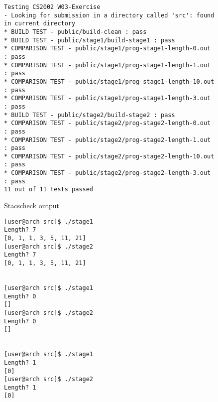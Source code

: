 \documentclass{article}
\begin{document}
\begin{figure}[H]
\begin{verbatim}
Testing CS2002 W03-Exercise
- Looking for submission in a directory called 'src': found in current directory
* BUILD TEST - public/build-clean : pass
* BUILD TEST - public/stage1/build-stage1 : pass
* COMPARISON TEST - public/stage1/prog-stage1-length-0.out : pass
* COMPARISON TEST - public/stage1/prog-stage1-length-1.out : pass
* COMPARISON TEST - public/stage1/prog-stage1-length-10.out : pass
* COMPARISON TEST - public/stage1/prog-stage1-length-3.out : pass
* BUILD TEST - public/stage2/build-stage2 : pass
* COMPARISON TEST - public/stage2/prog-stage2-length-0.out : pass
* COMPARISON TEST - public/stage2/prog-stage2-length-1.out : pass
* COMPARISON TEST - public/stage2/prog-stage2-length-10.out : pass
* COMPARISON TEST - public/stage2/prog-stage2-length-3.out : pass
11 out of 11 tests passed
\end{verbatim}
\caption{Stacscheck output}
\end{figure}

\begin{figure}[H]
\begin{verbatim}
[user@arch src]$ ./stage1
Length? 7
[0, 1, 1, 3, 5, 11, 21]
[user@arch src]$ ./stage2
Length? 7
[0, 1, 1, 3, 5, 11, 21]


[user@arch src]$ ./stage1
Length? 0
[]
[user@arch src]$ ./stage2
Length? 0
[]


[user@arch src]$ ./stage1
Length? 1
[0]
[user@arch src]$ ./stage2
Length? 1
[0]


\end{verbatim}
\end{figure}
\end{document}
